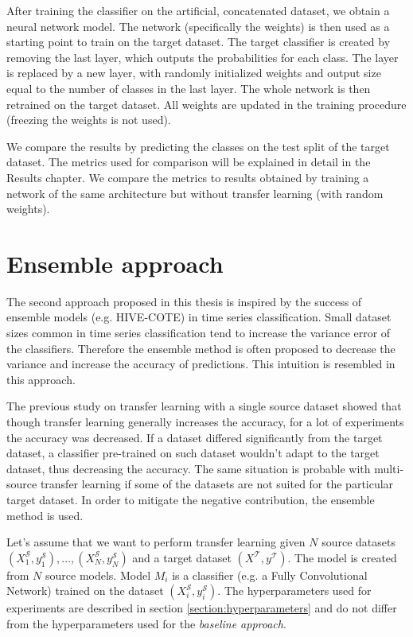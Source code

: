 \documentclass[a4paper,11pt,twoside]{report}
\theoremstyle{definition}
\begin{document}
After training the classifier on the artificial, concatenated dataset, we obtain a neural network model. The network (specifically the weights) is then used as a starting point to train on the target dataset. The target classifier is created by removing the last layer, which outputs the probabilities for each class. The layer is replaced by a new layer, with randomly initialized weights and output size equal to the number of classes in the last layer. The whole network is then retrained on the target dataset. All weights are updated in the training procedure (freezing the weights is not used).

We compare the results by predicting the classes on the test split of the target dataset. The metrics used for comparison will be explained in detail in the Results chapter. We compare the metrics to results obtained by training a network of the same architecture but without transfer learning (with random weights).

\section{Ensemble approach}\label{section:ensemble}
The second approach proposed in this thesis is inspired by the success of ensemble models (e.g. HIVE-COTE) %
 in time series classification. Small dataset sizes common in time series classification tend to increase the variance error of the classifiers. Therefore the ensemble method is often proposed to decrease the variance and increase the accuracy of predictions. This intuition is resembled in this approach.

The previous study on transfer learning with a single source dataset \cite{transfer_learning_time_series} showed that though transfer learning generally increases the accuracy, for a lot of experiments the accuracy was decreased. If a dataset differed significantly from the target dataset, a classifier pre-trained on such dataset wouldn't adapt to the target dataset, thus decreasing the accuracy. The same situation is probable with multi-source transfer learning if some of the datasets are not suited for the particular target dataset. In order to mitigate the negative contribution, the ensemble method is used.

Let's assume that we want to perform transfer learning given $N$ source datasets $(X^\mathcal{S}_1, y^\mathcal{S}_1), \dots, (X^\mathcal{S}_N, y^\mathcal{S}_N)$ and a target dataset $(X^\mathcal{T}, y^\mathcal{T})$.
The model is created from $N$ source models. Model $M_i$ is a classifier (e.g. a Fully Convolutional Network) trained on the dataset $(X^\mathcal{S}_i, y^\mathcal{S}_i)$. The hyperparameters used for experiments are described in section \ref{section:hyperparameters} and do not differ from the hyperparameters used for the \textit{baseline approach}. %
\end{document}
